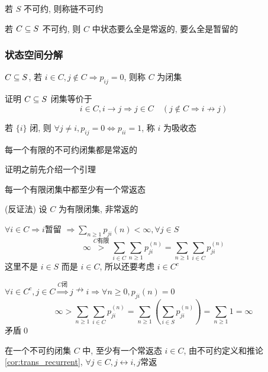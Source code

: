 \begin{definition}[链的不可约]
    若 $S$ 不可约, 则称链不可约
\end{definition}

\begin{theorem}
    若 $C\subseteq S$ 不可约, 则 $C$ 中状态要么全是常返的, 要么全是暂留的
\end{theorem}

\subsubsection{状态空间分解}
\begin{definition}[闭集]
    $C\subseteq S$, 若 $i\in C,j\notin C\Rightarrow p_{ij}=0$, 则称 $C$ 为闭集
\end{definition}

\begin{problem}[作业6-3]
    证明 $C\subseteq S$ 闭集等价于
    \[
    i\in C,i\to j\Rightarrow j\in C\quad (j\notin C\Rightarrow i\nrightarrow j)
    \]
\end{problem}

\begin{example}
    若 $\{i\}$ 闭, 则 $\forall j\neq i,p_{ij}=0\Leftrightarrow p_{ii}=1$, 称 $i$ 为吸收态
\end{example}

\begin{theorem}
    每一个有限的不可约闭集都是常返的
\end{theorem}

证明之前先介绍一个引理

\begin{lemma}
    每一个有限闭集中都至少有一个常返态
\end{lemma}

(反证法) 设 $C$ 为有限闭集, 非常返的

$\forall i\in C\Rightarrow i$暂留 $\Rightarrow \sum_{n\geq 1}p_{ji}(n)<\infty,\forall j\in S$
\[
\infty\overset{C\text{有限}}{>}\sum_{i\in C}\sum_{n\geq 1}p_{ji}^{(n)}=\sum_{n\geq 1}\sum_{i\in C}p_{ji}^{(n)}
\]
这里不是 $i\in S$ 而是 $i\in C$, 所以还要考虑 $i\in C^c$

$\forall i\in C^c,j\in C\overset{C\text{闭}}{\Rightarrow}j\nrightarrow i \Rightarrow \forall n\geq 0,p_{ji}(n)=0$
\[
\infty>\sum_{n\geq 1}\sum_{i\in C}p_{ji}^{(n)}=\sum_{n\geq 1}\left(\sum_{i\in S}p_{ji}^{(n)}\right)=\sum_{n\geq 1}1=\infty
\]
矛盾\qed

在一个不可约闭集 $C$ 中, 至少有一个常返态 $i\in C$, 由不可约定义和推论\ref{cor:trans_recurrent}, $\forall j\in C,j\leftrightarrow i,j$常返

